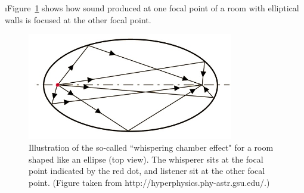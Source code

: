 \i Figure~\ref{f:whispering_chamber} shows how 
sound produced at one focal point of a room 
with elliptical walls is focused at the 
other focal point. 
%
\begin{figure}[htbp]
\begin{center}
\includegraphics[width=0.8\textwidth]{whispering_chamber}
\caption{Illustration of the so-called
``whispering chamber effect"
for a room shaped like an ellipse (top view).
The whisperer sits at the focal point indicated by
the red dot, and listener sit at the other focal point.
(Figure taken from  
{http://hyperphysics.phy-astr.gsu.edu/}.)}
\label{f:whispering_chamber}
\end{center}
\end{figure}
%

